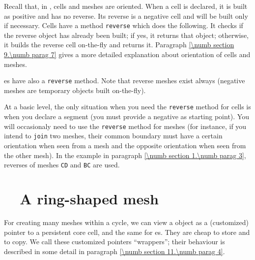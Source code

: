 Recall that, in \maniFEM, cells and meshes are oriented.
When a cell is declared, it is built as positive and has no reverse.
Its reverse is a negative cell and will be built only if necessary.
Cells have a method {\small\tt reverse} which does the following.
It checks if the reverse object has already been built; if yes, it returns that object;
otherwise, it builds the reverse cell on-the-fly and returns it.
Paragraph \ref{\numb section 9.\numb parag 7} gives a more detailed explanation about
orientation of cells and meshes.

{\small\tt {}}es have also a {\small\tt reverse} method.
Note that reverse meshes exist always (negative meshes are temporary objects built
on-the-fly).

At a basic level, the only situation when you need the {\small\tt reverse} method  for cells is
when you declare a segment {\small\tt {}} (you must provide a negative
{\small\tt {}} as starting point).
You will occasionaly need to use the {\small\tt reverse} method for meshes (for instance, if you
intend to {\small\tt join} two meshes, their common boundary must have a certain orientation when
seen from a mesh and the opposite orientation when seen from the other mesh).
In the example in paragraph \ref{\numb section 1.\numb parag 3},
reverses of meshes {\small\tt CD} and {\small\tt BC} are used.


\section{~~A ring-shaped mesh}\label{\numb section 9.\numb parag 2}

For creating many meshes within a cycle, we can view a {\small\tt {}} object as a
(customized) pointer to a persistent core cell, and the same for {\small\tt {}}es.
They are cheap to store and to copy.
We call these customized pointers ``wrappers''; their behaviour is described in some detail in
paragraph \ref{\numb section 11.\numb parag 4}.

